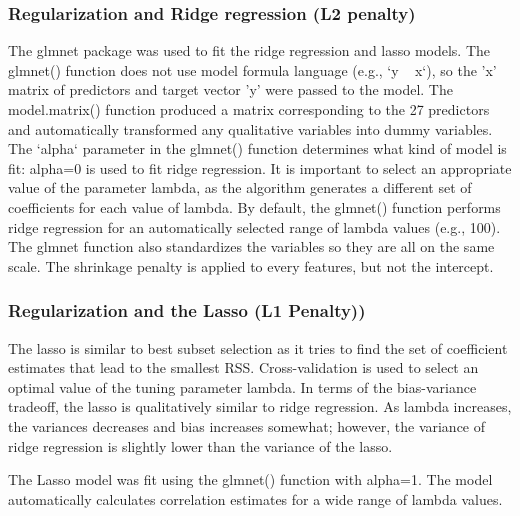\documentclass[sigconf]{acmart}
\begin{document}

\subsubsection{Regularization and Ridge regression (L2 penalty)} 

The glmnet package was used to fit the ridge regression and lasso models. 
The glmnet() function does not use model formula language (e.g., `y ~ x`), 
so the 'x' matrix of predictors and target vector 'y' were passed to the 
model. The model.matrix() function produced a matrix corresponding to the 
27 predictors and automatically transformed any qualitative variables into
dummy variables. The `alpha` parameter in the glmnet() function determines 
what kind of model is fit: alpha=0 is used to fit ridge regression. It is
important to select an appropriate value of the parameter lambda, as the
algorithm generates a different set of coefficients for each value of 
lambda. By default, the glmnet() function performs ridge regression for an 
automatically selected range of lambda values (e.g., 100). The glmnet 
function also standardizes the variables so they are all on the same scale.
The shrinkage penalty is applied to every features, but not the intercept. 


\subsubsection{Regularization and the Lasso (L1 Penalty))} 
 
The lasso is similar to best subset selection as it tries to find the set of 
coefficient estimates that lead to the smallest RSS. Cross-validation is used to 
select an optimal value of the tuning parameter lambda. In terms of the bias-variance
tradeoff, the lasso is qualitatively similar to ridge regression. As lambda
increases, the variances decreases and bias increases somewhat; however, the
variance of ridge regression is slightly lower than the variance of the lasso.
 
The Lasso model was fit using the glmnet() function with alpha=1. The model
automatically calculates correlation estimates for a wide range of lambda
values.
 
\end{document}
